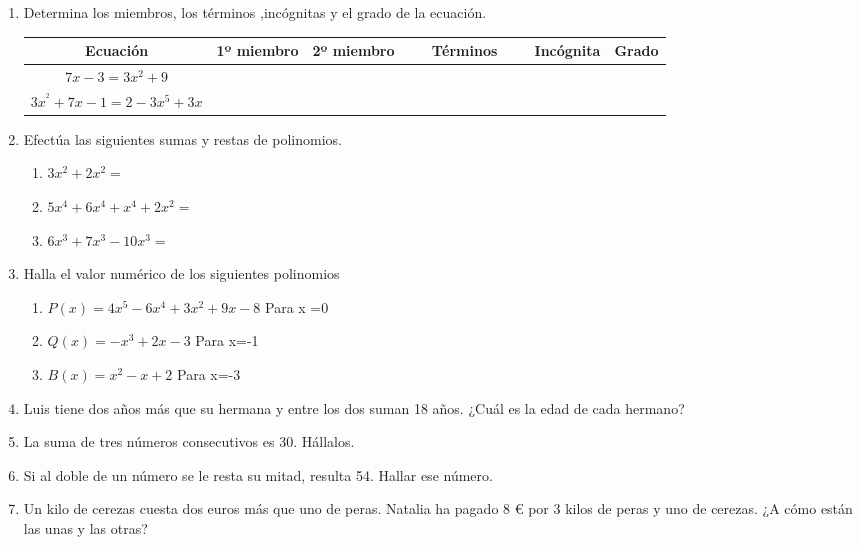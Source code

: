 \documentclass[a4paper,12pt]{article}
\begin{document}
\begin{enumerate}
        \item  Determina los miembros, los términos ,incógnitas y el grado de la ecuación.
        
        \begin{tabular}{| c | c | c | c | c | c |}
                \hline
                Ecuación & 1º miembro & 2º miembro & Términos & Incógnita & Grado \\
                \hline
                $7x-3 = 3x^2 +9$ &&& $\qquad \qquad \qquad \qquad $ &&\\ \hline
                $3x^^2+7x-1 = 2-3x^5+3x$ &&& $\qquad \qquad \qquad \qquad $ &&\\ 
                \hline
            \end{tabular}
           
        \item Efectúa las siguientes sumas y restas de polinomios. 
            \begin{enumerate}
                \item $3 x^2 + 2 x^2 =$
                \item $5x^4+6x^4+x^4+2x^2=$
                \item $6x^3+7x^3-10x^3=$
            \end{enumerate}

        \item Halla el valor numérico de los siguientes polinomios
        \begin{enumerate}
            \item $P(x) = 4x^5-6x^4+3x^2+9x-8$ Para x =0
            \item $Q(x) = -x^3+2x-3 $ Para x=-1
            \item $B(x) = x^2-x+2$ Para x=-3
        \end{enumerate}
        \item  Luis tiene dos años más que su hermana y entre los dos suman 18 años. ¿Cuál es la edad de cada hermano? 
        \item  La suma de tres números consecutivos es 30. Hállalos. 
        \item Si al doble de un número se le resta su mitad, resulta 54. Hallar ese número.
        \item Un kilo de cerezas cuesta dos euros más que uno de peras. Natalia ha pagado 8 € por 3 kilos de peras y uno de cerezas. ¿A cómo están las unas y las otras?
    \end{enumerate}
\end{document}
